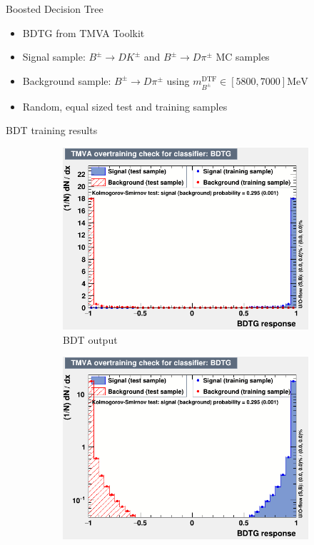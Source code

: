 \documentclass{beamer}
\begin{document}
\begin{frame}{Boosted Decision Tree}
  \begin{itemize}
    \setlength\itemsep{1.2em}
    \item{BDTG from TMVA Toolkit}
    \item{Signal sample: $B^\pm\to DK^\pm$ and $B^\pm\to D\pi^\pm$ MC samples}
    \item{Background sample: $B^\pm\to D\pi^\pm$ using $m_{B^\pm}^\text{DTF}\in[5800, 7000]\si{\mega\eV}$}
    \item{Random, equal sized test and training samples}
  \end{itemize}
\end{frame}

\begin{frame}{BDT training results}
  \begin{figure}
    \centering
    \vspace{-0.2cm}
    \begin{subfigure}{0.5\textwidth}
      \includegraphics[width = 1.0\textwidth]{Plots/overtrain_BDTG.png}
      \caption{BDT output}
    \end{subfigure}%
    \begin{subfigure}{0.5\textwidth}
      \includegraphics[width = 1.0\textwidth]{Plots/overtrain_BDTG_log.png}

\end{subfigure}
\end{figure}
\end{frame}
\end{document}
